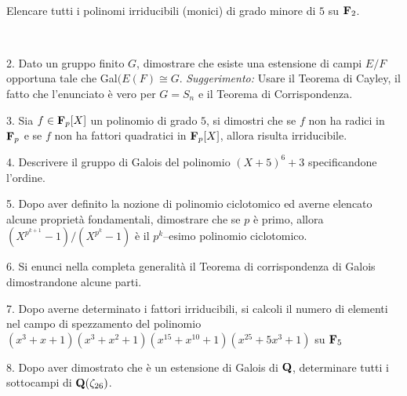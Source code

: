 \ \dotfill\ \bigskip\bigskip\bigskip\vfil

 Elencare tutti i polinomi irriducibili (monici) di grado minore di $5$ su ${\bf F}_{2}$.\medskip\bigskip\bigskip

\ \dotfill\ \bigskip\bigskip\bigskip

% 

\vfil\eject


\item{2.} Dato un gruppo finito $G$, dimostrare che esiste una estensione di campi $E/F$ opportuna tale che
Gal$(E(F)\cong G$.\hfill\break 
{\it Suggerimento:} Usare il Teorema di Cayley, il fatto che l'enunciato \`e vero
per $G=S_n$ e il Teorema di Corrispondenza.

\vv


\item{3.}  Sia $f\in{\bf F}_p[X]$ un polinomio di grado $5$,  si dimostri
che se $f$ non ha radici in ${\bf F}_p$ e se
$f$ non ha fattori quadratici in ${\bf F}_p[X]$, allora risulta irriducibile.
\ve\ \vs


\item{4.} Descrivere il gruppo di Galois del polinomio $(X+5)^6+3$ specificandone l'ordine.\vv

\item{5.} Dopo aver definito la nozione di polinomio ciclotomico ed
averne elencato alcune propriet\`a fondamentali, dimostrare che se $p$ \`e primo, allora $(X^{p^{k+1}}-1)/(X^{p^k}-1)$ \`e 
il $p^k$--esimo polinomio ciclotomico.
\ve\ \vs


\item{6.} Si enunci nella completa generalit\`a il Teorema di
corrispondenza di Galois dimostrandone alcune parti.\vskip 6cm\bigskip\bigskip\bigskip\vv\vv


\item{7.} Dopo averne determinato i fattori irriducibili, si calcoli il numero di elementi nel campo di spezzamento del polinomio 
$(x^3+x+1)(x^3+x^2+1)(x^{15}+x^{10}+1)(x^{25}+5x^{3}+1)$ su ${\bf F}_5$
\vskip 6cm\bigskip\bigskip\bigskip\vv\vv

\item{8.} Dopo aver dimostrato che \`{e} un estensione di Galois
di ${\bf Q}$, determinare tutti i sottocampi di ${\bf
Q}(\zeta_{26})$.

\vv

\ \vst
\bye
